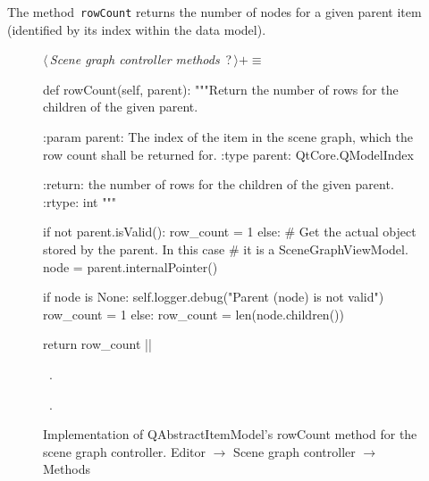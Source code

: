 \documentclass[%
    a4paper,    %
    justified,  %
    nobib,      %
    openany     %
]{tufte-book}
\makeatletter
\renewcommand{\label}[1]{\@tufte@label{##1}}%
\makeatother
\begin{document}
The method~\verb=rowCount= returns the number of nodes for a given parent
item (identified by its index within the data model).

\begin{figure}
\begin{flushleft} \small
\begin{minipage}{\linewidth}\label{scrap34}\raggedright\small
{} $\langle\,${\itshape Scene graph controller methods}\nobreak\ {\footnotesize {?}}$\,\rangle+\equiv$
\vspace{-1ex}
\begin{pythoncode}
def rowCount(self, parent):
    """Return the number of rows for the children of the given
    parent.

    :param parent: The index of the item in the scene graph, which
                   the row count shall be returned for.
    :type  parent: QtCore.QModelIndex

    :return: the number of rows for the children of the given
             parent.
    :rtype:  int
    """

    if not parent.isValid():
        row_count = 1
    else:
        # Get the actual object stored by the parent. In this case
        # it is a SceneGraphViewModel.
        node = parent.internalPointer()

        if node is None:
            self.logger.debug("Parent (node) is not valid")
            row_count = 1
        else:
            row_count = len(node.children())

    return row_count
|\NWsep|
\end{pythoncode}
\vspace{1.5ex}
\footnotesize
\begin{list}{}{\setlength{\itemsep}{-\parsep}\setlength{\itemindent}{-\leftmargin}}
\item \NWtxtMacroDefBy\ .
\item \NWtxtMacroRefIn\ .

\item{}
\end{list}
\end{minipage}\vspace{4ex}
\end{flushleft}
\caption{Implementation of QAbstractItemModel's rowCount method for the scene
  graph controller.
  \newline{}\newline{}Editor $\rightarrow$ Scene graph controller $\rightarrow$
  Methods}
\label{editor:lst:scene-graph-controller:methods:row-count}
\end{figure}
\end{document}
